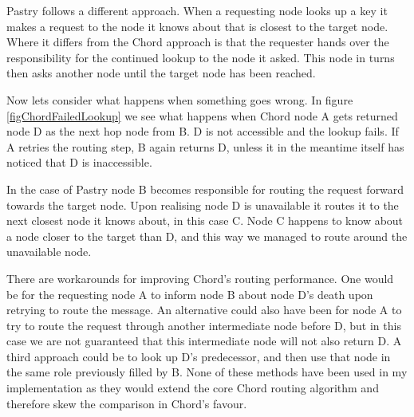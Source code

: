 Pastry follows a different approach. When a requesting node looks up a key it makes a request to the node it knows about that is closest to the target node. Where it differs from the Chord approach is that the requester hands over the responsibility for the continued lookup to the node it asked. This node in turns then asks another node until the target node has been reached.

Now lets consider what happens when something goes wrong.
In figure \ref{figChordFailedLookup} we see what happens when Chord node A gets returned node D as the next hop node from B. D is not accessible and the lookup fails. If A retries the routing step, B again returns D, unless it in the meantime itself has noticed that D is inaccessible.

In the case of Pastry node B becomes responsible for routing the request forward towards the target node. Upon realising node D is unavailable it routes it to the next closest node it knows about, in this case C. Node C happens to know about a node closer to the target than D, and this way we managed to route around the unavailable node.

There are workarounds for improving Chord's routing performance. One would be for the requesting node A to inform node B about node D's death upon retrying to route the message. An alternative could also have been for node A to try to route the request through another intermediate node before D, but in this case we are not guaranteed that this intermediate node will not also return D.
A third approach could be to look up D's predecessor, and then use that node in the same role previously filled by B. None of these methods have been used in my implementation as they would extend the core Chord routing algorithm and therefore skew the comparison in Chord's favour.

